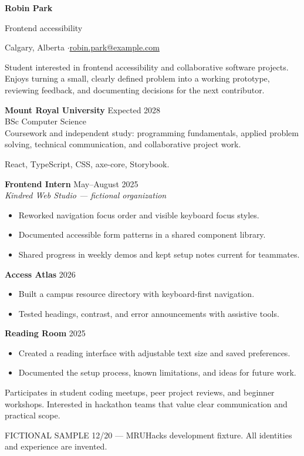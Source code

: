 
{\Huge\bfseries Robin Park}\par
{\large\color{accent} Frontend accessibility}\par
Calgary, Alberta \enspace$\cdot$\enspace \href{mailto:robin.park@example.com}{robin.park@example.com}

Student interested in frontend accessibility and collaborative software projects.
Enjoys turning a small, clearly defined problem into a working prototype,
reviewing feedback, and documenting decisions for the next contributor.

\textbf{Mount Royal University} \hfill Expected 2028\\
BSc Computer Science\\
Coursework and independent study: programming fundamentals, applied problem solving,
technical communication, and collaborative project work.

React, TypeScript, CSS, axe-core, Storybook.

\textbf{Frontend Intern} \hfill May--August 2025\\
\textit{Kindred Web Studio --- fictional organization}
\begin{itemize}
\item Reworked navigation focus order and visible keyboard focus styles.
\item Documented accessible form patterns in a shared component library.
\item Shared progress in weekly demos and kept setup notes current for teammates.
\end{itemize}

\textbf{Access Atlas} \hfill 2026
\begin{itemize}
\item Built a campus resource directory with keyboard-first navigation.
\item Tested headings, contrast, and error announcements with assistive tools.
\end{itemize}
\textbf{Reading Room} \hfill 2025
\begin{itemize}
\item Created a reading interface with adjustable text size and saved preferences.
\item Documented the setup process, known limitations, and ideas for future work.
\end{itemize}

Participates in student coding meetups, peer project reviews, and beginner workshops.
Interested in hackathon teams that value clear communication and practical scope.

\vfill
{\footnotesize\color{gray} FICTIONAL SAMPLE 12/20 --- MRUHacks development fixture.
All identities and experience are invented.}

